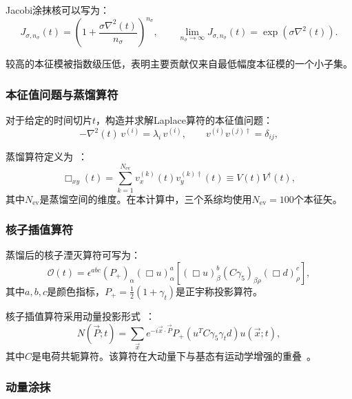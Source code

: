 \documentclass[12pt,a4paper]{ctexart}
\theoremstyle{definition}
\begin{document}
Jacobi涂抹核可以写为：
\begin{equation}\label{eq:jacobi}
    J_{\sigma, n_\sigma}(t) = \left(1 + \frac{\sigma \nabla^2(t)}{n_\sigma}\right)^{n_\sigma}, \qquad \lim_{n_\sigma \to \infty} J_{\sigma, n_\sigma}(t) = \exp(\sigma \nabla^2(t)).
\end{equation}

较高的本征模被指数级压低，表明主要贡献仅来自最低幅度本征模的一个小子集。

\subsubsection{本征值问题与蒸馏算符}

对于给定的时间切片$t$，构造并求解Laplace算符的本征值问题：
\begin{equation}\label{eq:eigenvalue}
    -\nabla^2(t) \, v^{(i)} = \lambda_i \, v^{(i)}, \qquad v^{(i)} v^{(j)\dagger} = \delta_{ij},
\end{equation}

蒸馏算符定义为~\cite{Peardon:2009gh}：
\begin{equation}\label{eq:distillation}
    \Box_{xy}(t) = \sum_{k=1}^{N_{\text{ev}}} v^{(k)}_x(t) v^{(k)\dagger}_y(t) \equiv V(t) V^\dagger(t),
\end{equation}
其中$N_{\text{ev}}$是蒸馏空间的维度。在本计算中，三个系综均使用$N_{\text{ev}} = 100$个本征矢。

\subsubsection{核子插值算符}

蒸馏后的核子湮灭算符可写为：
\begin{equation}\label{eq:nucleon_dist}
    \mathcal{O}(t) = \epsilon^{abc} (P_+)_\alpha (\Box u)^a_\alpha \left[(\Box u)^b_\beta (C\gamma_5)_{\beta\rho} (\Box d)^c_\rho\right],
\end{equation}
其中$a,b,c$是颜色指标，$P_+ = \frac{1}{2}(1+\gamma_t)$是正宇称投影算符。

核子插值算符采用动量投影形式~\cite{Egerer:2020xma,Zhang2025}：
\begin{equation}\label{eq:N_operator}
    N(\vec{P}; t) = \sum_{\vec{x}} e^{-i\vec{x}\cdot\vec{P}} P_+ (u^T C \gamma_5 \gamma_t d) u(\vec{x}; t),
\end{equation}
其中$C$是电荷共轭算符。该算符在大动量下与基态有运动学增强的重叠~\cite{Zhang2025}。

\subsubsection{动量涂抹}
\end{document}
